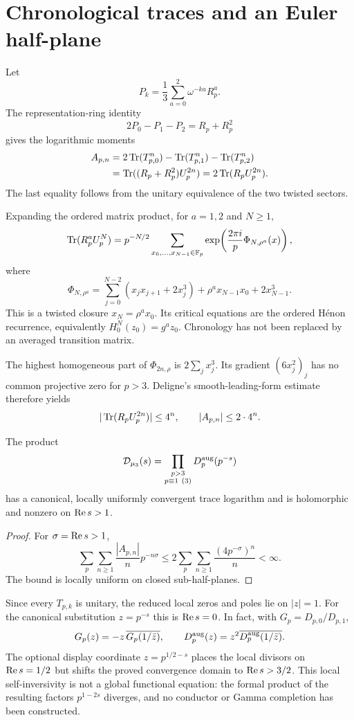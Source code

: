 \section{Chronological traces and an Euler half-plane}

Let
\[
P_k=\frac13\sum_{a=0}^2\omega^{-ka}R_p^a.
\]
The representation-ring identity
\[
2P_0-P_1-P_2=R_p+R_p^2
\]
gives the logarithmic moments
\begin{align}
A_{p,n}
&=2\operatorname{Tr}(T_{p,0}^n)-\operatorname{Tr}(T_{p,1}^n)-\operatorname{Tr}(T_{p,2}^n)\notag\\
&=\operatorname{Tr}((R_p+R_p^2)U_p^{2n})
=2\operatorname{Tr}(R_pU_p^{2n}).\label{eq:moment}
\end{align}
The last equality follows from the unitary equivalence of the two twisted
sectors.

Expanding the ordered matrix product, for $a=1,2$ and $N\ge1$,
\[
\operatorname{Tr}(R_p^aU_p^N)=p^{-N/2}
\sum_{x_0,\ldots,x_{N-1}\in\mathbb F_p}
\exp\!\left(\frac{2\pi i}{p}\Phi_{N,\rho^a}(x)\right),
\]
where
\[
\Phi_{N,\rho^a}
=\sum_{j=0}^{N-2}(x_jx_{j+1}+2x_j^3)
+\rho^a x_{N-1}x_0+2x_{N-1}^3.
\]
This is a twisted closure $x_N=\rho^a x_0$.  Its critical equations are the
ordered H\'enon recurrence, equivalently
$H_0^N(z_0)=g^az_0$.  Chronology has not been replaced by an averaged
transition matrix.

The highest homogeneous part of $\Phi_{2n,\rho}$ is
$2\sum_jx_j^3$.  Its gradient $(6x_j^2)_j$ has no common projective zero for
$p>3$.  Deligne's smooth-leading-form estimate therefore yields
\[
|\operatorname{Tr}(R_pU_p^{2n})|\le4^n,
\qquad |A_{p,n}|\le2\cdot4^n.
\]

\begin{theorem}\label{thm:euler}
The product
\[
\mathcal D_{\mu_3}(s)=
\prod_{\substack{p>3\\p\equiv1\ (3)}}
D^{\mathrm{aug}}_p(p^{-s})
\]
has a canonical, locally uniformly convergent trace logarithm and is
holomorphic and nonzero on $\operatorname{Re} s>1$.
\end{theorem}

\begin{proof}
For $\sigma=\operatorname{Re} s>1$,
\[
\sum_p\sum_{n\ge1}\frac{|A_{p,n}|}{n}
p^{-n\sigma}
\le2\sum_p\sum_{n\ge1}
\frac{(4p^{-\sigma})^n}{n}<\infty.
\]
The bound is locally uniform on closed sub-half-planes.
\end{proof}

Since every $T_{p,k}$ is unitary, the reduced local zeros and poles lie on
$|z|=1$.  For the canonical substitution $z=p^{-s}$ this is
$\operatorname{Re} s=0$.  In fact, with $G_p=D_{p,0}/D_{p,1}$,
\[
G_p(z)=-z\,\overline{G_p(1/\bar z)},
\qquad
D^{\mathrm{aug}}_p(z)=z^2\overline{D^{\mathrm{aug}}_p(1/\bar z)}.
\]
The optional display coordinate $z=p^{1/2-s}$ places the local divisors on
$\operatorname{Re} s=1/2$ but shifts the proved convergence domain to
$\operatorname{Re} s>3/2$.  This local self-inversivity is not a global functional
equation: the formal
product of the resulting factors $p^{1-2s}$ diverges, and no conductor or
Gamma completion has been constructed.
